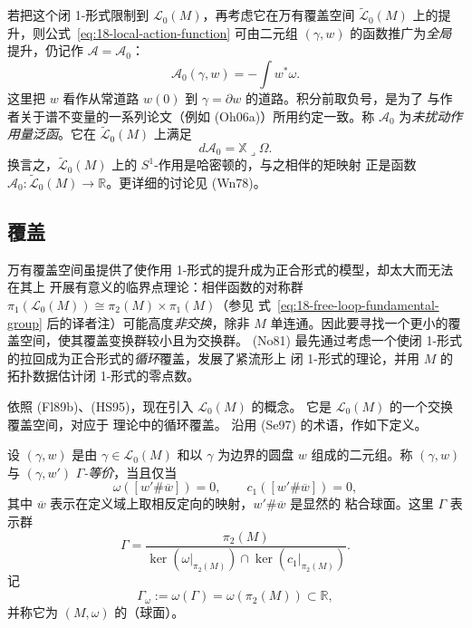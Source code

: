 若把这个闭 1-形式限制到 $\mathcal L_0(M)$，再考虑它在万有覆盖空间
$\widetilde{\mathcal L}_0(M)$ 上的提升，则公式~\eqref{eq:18-local-action-function}
可由二元组 $(\gamma,w)$ 的函数推广为\emph{全局}提升，仍记作
$\mathcal A=\mathcal A_0$：
\[
 \mathcal A_0(\gamma,w)=-\int w^*\omega.
\]
这里把 $w$ 看作从常道路 $w(0)$ 到 $\gamma=\partial w$ 的道路。积分前取负号，是为了
与作者关于谱不变量的一系列论文（例如 (Oh06a)）所用约定一致。称
$\mathcal A_0$ 为\emph{未扰动作用量泛函}。它在
$\widetilde{\mathcal L}_0(M)$ 上满足
\begin{equation}
 d\mathcal A_0=\mathbb X\mathbin{\lrcorner}\Omega.
 \label{eq:18-global-action-primitive}
\end{equation}
换言之，$\widetilde{\mathcal L}_0(M)$ 上的 $S^1$-作用是哈密顿的，与之相伴的矩映射
正是函数 $\mathcal A_0:\widetilde{\mathcal L}_0(M)\to\mathbb R$。更详细的讨论见
(Wn78)。

\subsection{\personNovikov{}覆盖}
\label{subsec:novikov-covering}

万有覆盖空间虽提供了使作用 1-形式的提升成为正合形式的模型，却太大而无法在其上
开展有意义的临界点理论：相伴函数的对称群
$\pi_1(\mathcal L_0(M))\cong\pi_2(M)\times\pi_1(M)$（参见
式~\eqref{eq:18-free-loop-fundamental-group} 后的译者注）可能高度\emph{非交换}，除非 $M$
单连通。因此要寻找一个更小的覆盖空间，使其覆盖变换群较小且为交换群。\personNovikov{}
(No81) 最先通过考虑一个使闭 1-形式的拉回成为正合形式的\emph{循环}覆盖，发展了紧流形上
闭 1-形式的\personMorse{}理论，并用 $M$ 的拓扑数据估计闭 1-形式的零点数。

依照 (Fl89b)、(HS95)，现在引入 $\mathcal L_0(M)$ 的\emph{\termNovikovCovering{}}概念。
它是 $\mathcal L_0(M)$ 的一个交换覆盖空间，对应于\personNovikov{} \personMorse{}理论中的循环覆盖。
沿用\personSeidel{} (Se97) 的术语，作如下定义。

\begin{definition}
\label{def:18-gamma-equivalence}
设 $(\gamma,w)$ 是由 $\gamma\in\mathcal L_0(M)$ 和以 $\gamma$ 为边界的圆盘 $w$
组成的二元组。称 $(\gamma,w)$ 与 $(\gamma,w')$ \emph{$\Gamma$-等价}，当且仅当
\[
 \omega([w'\#\overline w])=0,\qquad
 c_1([w'\#\overline w])=0,
\]
其中 $\overline w$ 表示在定义域上取相反定向的映射，$w'\#\overline w$ 是显然的
粘合球面。这里 $\Gamma$ 表示群
\[
 \Gamma=\frac{\pi_2(M)}
 {\ker(\omega|_{\pi_2(M)})\cap\ker(c_1|_{\pi_2(M)})}.
\]
记
\[
 \Gamma_\omega:=\omega(\Gamma)=\omega(\pi_2(M))\subset\mathbb R,
\]
并称它为 $(M,\omega)$ 的（球面）\emph{\termPeriodGroup{}}。
\end{definition}

